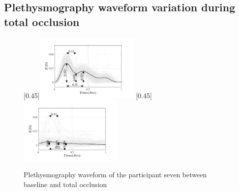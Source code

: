 \subsection{Plethysmography waveform variation during total occlusion}
\label{section apa 2.3}
\begin{figure}
	\centering
	\null\hfill%
	[0.45\textwidth]{\includegraphics[width=0.45\textwidth, trim={0.5cm 0cm 1.5cm 0 cm}, clip]{figure_apa_6a}}%
	\hfill%
	[0.45\textwidth]{\includegraphics[width=0.45\textwidth, trim={0.5cm 0cm 1.5cm 0 cm}, clip]{figure_apa_6b}}%
	\hfill\null%
	\caption{Plethysmography waveform of the participant seven between baseline and total occlusion}
	\label{fig:iPG_total}
	
	\vspace{1cm}
	

\end{figure}
